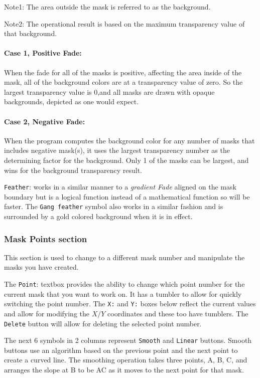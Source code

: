 Note1: The area outside the mask is referred to as the background.

Note2: The operational result is based on the maximum transparency value of that background.

\paragraph{Case 1, Positive Fade:} When the fade for all of the masks is positive, affecting the area inside of the mask, all of the
background colors are at a transparency value of zero. So the largest transparency value is 0,and all masks are drawn with opaque backgrounds, depicted as one would expect.

\paragraph{Case 2, Negative Fade:} When the program computes the background color for any number of masks that includes negative
mask(s), it uses the largest transparency number as the determining factor for the background. Only 1 of the masks can be largest, and wins for the background transparency result.

\vspace{3ex}\texttt{Feather}: works in a similar manner to a \textit{gradient Fade} aligned on the mask boundary but is a logical function instead of a mathematical function so will be faster.  The \texttt{Gang feather} symbol also works in a similar fashion and is surrounded by a gold colored background when it is in effect.

\subsubsection*{Mask Points section}%
\label{ssub:masks_points_section}

This section is used to change to a different mask number and manipulate the masks you have created.

The \texttt{Point}: textbox provides the ability to change which point number for the current mask that you want to work on.  It has a tumbler to allow for quickly switching the point number.  The \texttt{X:} and \texttt{Y:} boxes below reflect the current values and allow for modifying the $X/Y$ coordinates and these too have tumblers. The \texttt{Delete} button will allow for deleting the selected point number.

The next 6 symbols in 2 columns represent \texttt{Smooth} and \texttt{Linear} buttons.  Smooth buttons use an algorithm based on the previous point and the next point to create a curved line. The smoothing operation takes three points, A, B, C, and arranges the slope at B to be AC as it moves to the next point for that mask.

